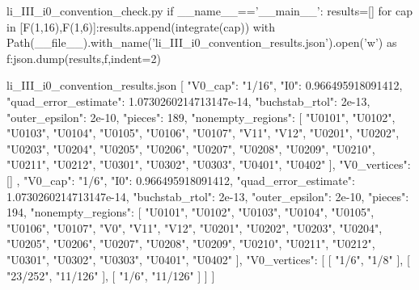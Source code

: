 \begin{filecontents*}[overwrite]{li_III_i0_convention_check.py}
if __name__=='__main__':
    results=[]
    for cap in [F(1,16),F(1,6)]:results.append(integrate(cap))
    with Path(__file__).with_name('li_III_i0_convention_results.json').open('w') as f:json.dump(results,f,indent=2)
\end{filecontents*}
\begin{filecontents*}[overwrite]{li_III_i0_convention_results.json}
[
  {
    "V0_cap": "1/16",
    "I0": 0.966495918091412,
    "quad_error_estimate": 1.0730260214713147e-14,
    "buchstab_rtol": 2e-13,
    "outer_epsilon": 2e-10,
    "pieces": 189,
    "nonempty_regions": [
      "U0101",
      "U0102",
      "U0103",
      "U0104",
      "U0105",
      "U0106",
      "U0107",
      "V11",
      "V12",
      "U0201",
      "U0202",
      "U0203",
      "U0204",
      "U0205",
      "U0206",
      "U0207",
      "U0208",
      "U0209",
      "U0210",
      "U0211",
      "U0212",
      "U0301",
      "U0302",
      "U0303",
      "U0401",
      "U0402"
    ],
    "V0_vertices": []
  },
  {
    "V0_cap": "1/6",
    "I0": 0.966495918091412,
    "quad_error_estimate": 1.0730260214713147e-14,
    "buchstab_rtol": 2e-13,
    "outer_epsilon": 2e-10,
    "pieces": 194,
    "nonempty_regions": [
      "U0101",
      "U0102",
      "U0103",
      "U0104",
      "U0105",
      "U0106",
      "U0107",
      "V0",
      "V11",
      "V12",
      "U0201",
      "U0202",
      "U0203",
      "U0204",
      "U0205",
      "U0206",
      "U0207",
      "U0208",
      "U0209",
      "U0210",
      "U0211",
      "U0212",
      "U0301",
      "U0302",
      "U0303",
      "U0401",
      "U0402"
    ],
    "V0_vertices": [
      [
        "1/6",
        "1/8"
      ],
      [
        "23/252",
        "11/126"
      ],
      [
        "1/6",
        "11/126"
      ]
    ]
  }
]
\end{filecontents*}


